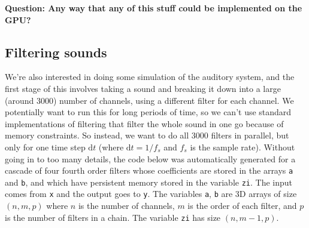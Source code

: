 \documentclass[a4paper]{article}
\newcommand{\code}[1]{\lstinline£#1£}
\newcommand{\ud}{\mathrm{d}}
\newcommand{\dt}{\ud t}
\newcommand{\question}[1]{\textbf{Question: #1}}
\begin{document}
\question{Any way that any of this stuff could be implemented on the GPU?}

\subsection{Filtering sounds}

We're also interested in doing some simulation of the auditory system, and the first stage of this involves taking a sound and breaking it down into a large (around 3000) number of channels, using a different filter for each channel. We potentially want to run this for long periods of time, so we can't use standard implementations of filtering that filter the whole sound in one go because of memory constraints. So instead, we want to do all 3000 filters in parallel, but only for one time step $\dt$ (where $\dt=1/f_s$ and $f_s$ is the sample rate). Without going in to too many details, the code below was automatically generated for a cascade of four fourth order filters whose coefficients are stored in the arrays \code{a} and \code{b}, and which have persistent memory stored in the variable \code{zi}. The input comes from \code{x} and the output goes to \code{y}. The variables \code{a}, \code{b} are 3D arrays of size $(n,m,p)$ where $n$ is the number of channels, $m$ is the order of each filter, and $p$ is the number of filters in a chain. The variable \code{zi} has size $(n,m-1,p)$.
\end{document}
